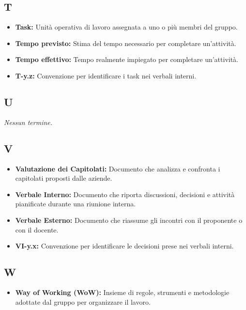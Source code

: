 {}
\subsection*{T}
\begin{itemize}[leftmargin=*]
    \item \textbf{Task:} Unità operativa di lavoro assegnata a uno o più membri del gruppo.
    \item \textbf{Tempo previsto:} Stima del tempo necessario per completare un’attività.
    \item \textbf{Tempo effettivo:} Tempo realmente impiegato per completare un’attività.
    \item \textbf{T-y.z:} Convenzione per identificare i task nei verbali interni.
\end{itemize}

{}
\subsection*{U}
\textit{Nessun termine.}

{}
\subsection*{V}
\begin{itemize}[leftmargin=*]
    \item \textbf{Valutazione dei Capitolati:} Documento che analizza e confronta i capitolati proposti dalle aziende.
    \item \textbf{Verbale Interno:} Documento che riporta discussioni, decisioni e attività pianificate durante una riunione interna.
    \item \textbf{Verbale Esterno:} Documento che riassume gli incontri con il proponente o con il docente.
    \item \textbf{VI-y.x:} Convenzione per identificare le decisioni prese nei verbali interni.
\end{itemize}

{}
\subsection*{W}
\begin{itemize}[leftmargin=*]
    \item \textbf{Way of Working (WoW):} Insieme di regole, strumenti e metodologie adottate dal gruppo per organizzare il lavoro.
\end{itemize}

